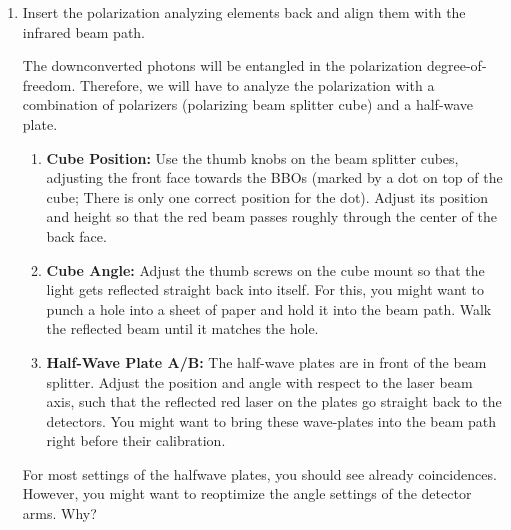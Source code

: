 \documentclass{../lab}
\begin{document}
\begin{enumerate}
\begin{enumerate}
    \item \textbf{Detector A/B Angle:} Adjust the thumb screws on the back of the detector (marked by green tapes) until the red laser cone is well centered on the BBOs. You can use a piece of white paper to see the beam if it helps. At the end, check the height of the beam at the detector and at the BBOs. See if two measurements are close.
    
    \textbf{Instructions for instructors if necessary:} adjust the thumb screws on the BBOs so that the back-reflection of the red circle is centered on the detector aperture. These thumb screws move both BBOs together. However, it may be difficult to align this back reflection for both arms.
    
    \end{enumerate}


    \item Insert the polarization analyzing elements back and align them with the infrared beam path.

The downconverted photons will be entangled in the polarization degree-of-freedom. Therefore, we will have to analyze the polarization with a combination of polarizers (polarizing beam splitter cube) and a half-wave plate. 

\begin{enumerate}
    \item \textbf{Cube Position:} Use the thumb knobs on the beam splitter cubes, adjusting the front face towards the BBOs (marked by a dot on top of the cube; There is only one correct position for the dot). Adjust its position and height so that the red beam passes roughly through the center of the back face.

    \item \textbf{Cube Angle:} Adjust the thumb screws on the cube mount so that the light gets reflected straight back into itself. For this, you might want to punch a hole into a sheet of paper and hold it into the beam path. Walk the reflected beam until it matches the hole.

    \item \textbf{Half-Wave Plate A/B:} The half-wave plates are in front of the beam splitter. Adjust the position and angle with respect to the laser beam axis, such that the reflected red laser on the plates go straight back to the detectors. You might want to bring these wave-plates into the beam path right before their calibration.
\end{enumerate}

For most settings of the halfwave plates, you should see already coincidences. However, you might want to reoptimize the angle settings of the detector arms. Why?

\end{enumerate}
\end{document}
